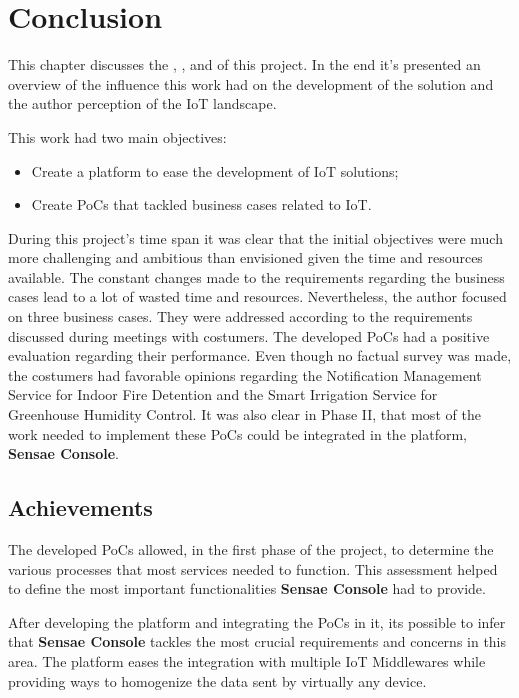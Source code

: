 \chapter{Conclusion}
\label{chap:conclusion}

This chapter discusses the , , and  of this project.
In the end it's presented an overview of the influence this work had on the development of the solution and the author perception of the \gls{IoT} landscape.

This work had two main objectives:

\begin{itemize}
    \item Create a platform to ease the development of \gls{IoT} solutions;
    \item Create \gls{PoC}s that tackled business cases related to \gls{IoT}.
\end{itemize}

During this project's time span it was clear that the initial objectives were much more challenging and ambitious than envisioned given the time and resources available. The constant changes made to the requirements regarding the business cases lead to a lot of wasted time and resources. Nevertheless, the author focused on three business cases. They were addressed according to the requirements discussed during meetings with costumers. The developed \gls{PoC}s had a positive evaluation regarding their performance. Even though no factual survey was made, the costumers had favorable opinions regarding the Notification Management Service for Indoor Fire Detention and the Smart Irrigation Service for Greenhouse Humidity Control. It was also clear in Phase II, that most of the work needed to implement these \gls{PoC}s could be integrated in the platform, \textbf{Sensae Console}.

\section{Achievements}
\label{sec:conclusion:achivements}

The developed \gls{PoC}s allowed, in the first phase of the project, to determine the various processes that most services needed to function. This assessment helped to define the most important functionalities \textbf{Sensae Console} had to provide.

After developing the platform and integrating the \gls{PoC}s in it, its possible to infer that \textbf{Sensae Console} tackles the most crucial requirements and concerns in this area. The platform eases the integration with multiple \gls{IoT} Middlewares while providing ways to homogenize the data sent by virtually any device.

